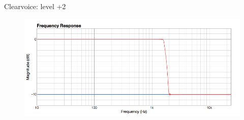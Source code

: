 \documentclass{beamer}
\begin{document}
\begin{frame}[t]{Clearvoice: level +2}
\begin{figure}[b]
\includegraphics[height=0.37\textwidth]{figure/cv2.png}
\end{figure}

\end{frame}


\end{document}
